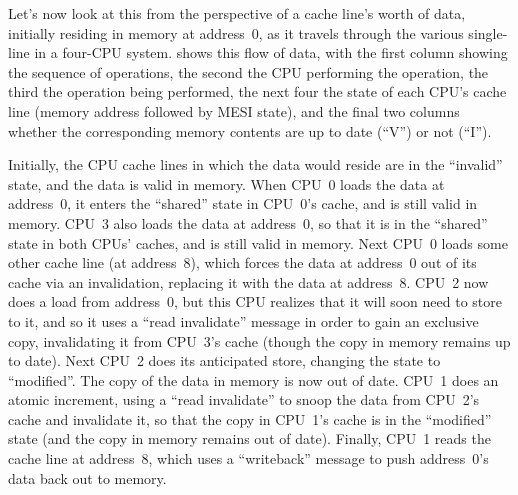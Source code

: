Let's now look at this from the perspective of a cache line's worth
of data, initially residing in memory at address~0,
as it travels through the various single-line
in a four-CPU system.
shows this flow of data, with the first column showing the sequence
of operations, the second the CPU performing the operation,
the third the operation being performed, the next four the state
of each CPU's cache line (memory address followed by MESI state),
and the final two columns whether the corresponding memory contents
are up to date (``V'') or not (``I'').

Initially, the CPU cache lines in which the data would reside are
in the ``invalid'' state, and the data is valid in memory.
When CPU~0 loads the data at address~0, it enters the ``shared'' state in
CPU~0's cache, and is still valid in memory.
CPU~3 also loads the data at address~0, so that it is in the
``shared'' state in both CPUs' caches, and is still valid in memory.
Next CPU~0 loads some other cache line (at address~8),
which forces the data at address~0 out of its cache via an invalidation,
replacing it with the data at address~8.
CPU~2 now does a load from address~0, but this CPU realizes that it will
soon need to store to it, and so it uses a ``read invalidate'' message
in order to gain an exclusive copy, invalidating
it from CPU~3's cache (though the copy in memory remains up to date).
Next CPU~2 does its anticipated store, changing the state to ``modified''.
The copy of the data in memory is now out of date.
CPU~1 does an atomic increment, using a ``read invalidate'' to snoop
the data from CPU~2's cache
and invalidate it, so that the copy in CPU~1's cache is in the ``modified''
state (and the copy in memory remains out of date).
Finally, CPU~1 reads the cache line at address~8, which uses a
``writeback'' message to push address~0's data back out to memory.

